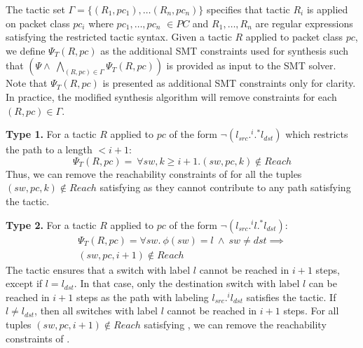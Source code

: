 The tactic set $\Gamma = \{(R_1, pc_1), \ldots (R_n, pc_n)\}$
specifies that tactic $R_i$ is applied on packet class $pc_i$ where 
$pc_1, \ldots, pc_n$ $\in PC$ and $R_1,\ldots,R_n$ are regular
expressions satisfying the restricted tactic syntax. 
Given a tactic $R$ applied to packet class $pc$, 
we define $\Psi_T(R,pc)$ as the additional SMT constraints used for 
synthesis such that  $(\Psi \wedge\ \bigwedge\limits_{(R, pc) \in \Gamma} \Psi_T(R,pc))$ 
is provided as input to the SMT solver.
	Note that $\Psi_T(R,pc)$ is presented as additional SMT 
constraints only for clarity. 
In practice, the modified synthesis algorithm will remove constraints for each 
$(R,pc)\in \Gamma$.

\noindent\textbf{Type 1.} For a tactic $R$ applied to $pc$ of the form $\neg (l_{src} .^i .^* l_{dst})$ which restricts the path to a length $ < i + 1$:
\begin{equation} \label{eq:type1}
	\Psi_T(R, pc) = ~ \forall sw,k \geq i + 1. (sw,pc,k) \notin Reach
\end{equation}
Thus, we can remove the reachability constraints  of  
for all the tuples $(sw,pc,k) \notin Reach$ satisfying 
as they cannot contribute to any path satisfying the tactic.  

\noindent\textbf{Type 2.} For a tactic $R$ applied to $pc$ 
of the form $\neg (l_{src}  .^i l .^* l_{dst})$:
\begin{multline} \label{eq:t1}
\Psi_T(R,pc) = \forall sw.~ \phi(sw) = l ~\wedge~ sw \not= dst \implies \\ 
(sw, pc, i + 1) \notin Reach
\end{multline}
The tactic ensures that a switch with label $l$ cannot be reached in $i+1$
steps, except if $l = l_{dst}$. In that case,
only the destination switch with label $l$ can be reached in $i+1$ steps as 
the path with labeling $l_{src}.^i l_{dst}$ satisfies the tactic. If $l \not= l_{dst}$, then
all switches with label $l$ cannot be reached in $i+1$ steps. For all tuples
$(sw, pc, i+1) \notin Reach$ satisfying , we can remove the reachability constraints of .


